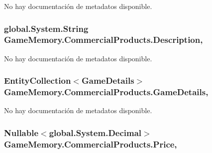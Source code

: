 No hay documentación de metadatos disponible. 

\hypertarget{class_game_memory_1_1_commercial_products_ac2bea26ba487b163251d3cc2e30f69c6}{
\subsubsection[{Description}]{\setlength{\rightskip}{0pt plus 5cm}global.\-System.\-String Game\-Memory.\-Commercial\-Products.\-Description\hspace{0.3cm}{\ttfamily [get]}, {\ttfamily [set]}}}\label{class_game_memory_1_1_commercial_products_ac2bea26ba487b163251d3cc2e30f69c6}


No hay documentación de metadatos disponible. 

\hypertarget{class_game_memory_1_1_commercial_products_a38d43a47cf06ac40a4c45b0a34a3e768}{
\subsubsection[{Game\-Details}]{\setlength{\rightskip}{0pt plus 5cm}Entity\-Collection$<${\bf Game\-Details}$>$ Game\-Memory.\-Commercial\-Products.\-Game\-Details\hspace{0.3cm}{\ttfamily [get]}, {\ttfamily [set]}}}\label{class_game_memory_1_1_commercial_products_a38d43a47cf06ac40a4c45b0a34a3e768}


No hay documentación de metadatos disponible. 

\hypertarget{class_game_memory_1_1_commercial_products_a7554ddad0d586549ac0902db89191c08}{
\subsubsection[{Price}]{\setlength{\rightskip}{0pt plus 5cm}Nullable$<$global.\-System.\-Decimal$>$ Game\-Memory.\-Commercial\-Products.\-Price\hspace{0.3cm}{\ttfamily [get]}, {\ttfamily [set]}}}\label{class_game_memory_1_1_commercial_products_a7554ddad0d586549ac0902db89191c08}


